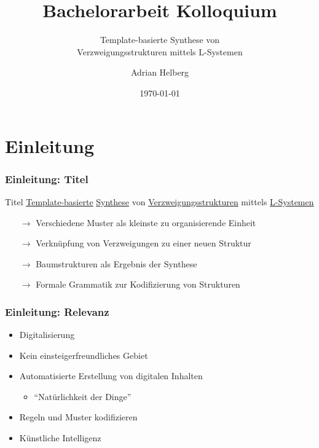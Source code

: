 \documentclass[12pt]{beamer}
\subtitle{Template-basierte Synthese von\\Verzweigungsstrukturen mittels L-Systemen}
\title{Bachelorarbeit Kolloquium}
\author{Adrian Helberg}
\institute{HAW Hamburg}
\date{\today}
\begin{document}
    \frame{\titlepage}

    \section{Einleitung}
    \label{sec:thema}
    \begin{frame}[allowframebreaks]
        \frametitle{Einleitung: Titel}

        \begin{block}{Titel}
            \color{olive}\underline{\color{black}Template-basierte} \color{teal}\underline{\color{black}Synthese} 
            \color{black}von \color{orange}\underline{\color{black}Verzweigungsstrukturen} \color{black}mittels 
            \color{cyan}\underline{\color{black}L-Systemen}
        \end{block}

        \begin{itemize}
            \item[\color{olive}$\rightarrow$] \color{black}Verschiedene Muster als kleinste zu organisierende Einheit
            \item[\color{teal}$\rightarrow$] \color{black}Verknüpfung von Verzweigungen zu einer neuen Struktur
            \item[\color{orange}$\rightarrow$] \color{black}Baumstrukturen als Ergebnis der Synthese
            \item[\color{cyan}$\rightarrow$] \color{black}Formale Grammatik zur Kodifizierung von Strukturen
        \end{itemize}
    \end{frame}

    \begin{frame}
        \frametitle{Einleitung: Relevanz}

        \begin{itemize}
            \setlength\itemsep{1em}
            \item<2-> Digitalisierung
            \item<3-> Kein einsteigerfreundliches Gebiet
            \item<4-> Automatisierte Erstellung von digitalen Inhalten
            \begin{itemize}
                \item "`Natürlichkeit der Dinge"'
            \end{itemize}
            \item<5-> Regeln und Muster kodifizieren
            \item<6-> Künstliche Intelligenz
        \end{itemize}
    \end{frame}
\end{document}
